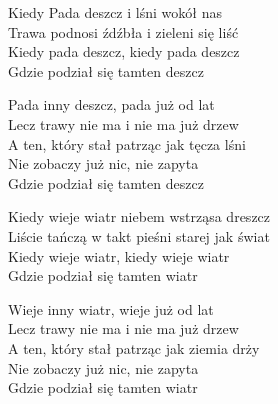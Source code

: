 
\begin{text}
    Kiedy Pada deszcz i lśni wokół nas\\
    Trawa podnosi źdźbła i zieleni się liść\\
    Kiedy pada deszcz, kiedy pada deszcz\\
    Gdzie podział się tamten deszcz

    Pada inny deszcz, pada już od lat\\
    Lecz trawy nie ma i nie ma już drzew\\
    A ten, który stał patrząc jak tęcza lśni\\
    Nie zobaczy już nic, nie zapyta\\
    Gdzie podział się tamten deszcz

    Kiedy wieje wiatr niebem wstrząsa dreszcz\\
    Liście tańczą w takt pieśni starej jak świat\\
    Kiedy wieje wiatr, kiedy wieje wiatr\\
    Gdzie podział się tamten wiatr

    Wieje inny wiatr, wieje już od lat\\
    Lecz trawy nie ma i nie ma już drzew\\
    A ten, który stał patrząc jak ziemia drży\\
    Nie zobaczy już nic, nie zapyta\\
    Gdzie podział się tamten wiatr
\end{text}
\begin{chord}

\end{chord}